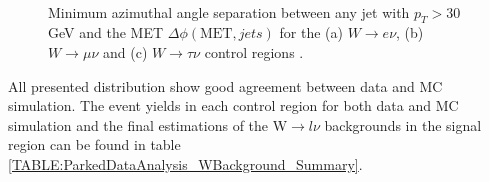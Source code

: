 \begin{figure}[!htb]
\centering
{}
 \\
\caption{Minimum azimuthal angle separation between any jet with $p_{T}>30$ GeV and the \gls{MET} $\Delta\phi(\text{MET},jets)$ for the (a) $W\rightarrow e\nu$, (b) $W\rightarrow\mu\nu$ and (c) $W\rightarrow\tau\nu$ control regions \cite{ARTICLE:CMSVBFHiggsInvisibleParkedAnalysisPAS}.}
\label{FIGURE:ParkedDataAnalysis_WBackground_MinDeltaPhi}
\end{figure}
 
All presented distribution show good agreement between data and \gls{MC} simulation. The event yields in each control region for both data and \gls{MC} simulation and the final estimations of the W$\rightarrow l\nu$ backgrounds in the signal region can be found in table \ref{TABLE:ParkedDataAnalysis_WBackground_Summary}.
 

